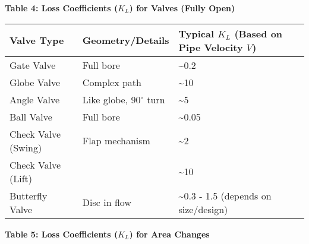 \textbf{Table 4: Loss Coefficients (\(K_L\)) for Valves (Fully Open)}

\begin{longtable}[]{@{}lll@{}}
\toprule
Valve Type & Geometry/Details & Typical \(K_L\) (Based on Pipe Velocity
\(V\))\tabularnewline
\midrule
\endhead
Gate Valve & Full bore & \textasciitilde0.2\tabularnewline
Globe Valve & Complex path & \textasciitilde10\tabularnewline
Angle Valve & Like globe, 90\(^\circ\) turn &
\textasciitilde5\tabularnewline
Ball Valve & Full bore & \textasciitilde0.05\tabularnewline
Check Valve (Swing) & Flap mechanism & \textasciitilde2\tabularnewline
Check Valve (Lift) & & \textasciitilde10\tabularnewline
Butterfly Valve & Disc in flow & \textasciitilde0.3 - 1.5 (depends on
size/design)\tabularnewline
\bottomrule
\end{longtable}

\textbf{Table 5: Loss Coefficients (\(K_L\)) for Area Changes}


